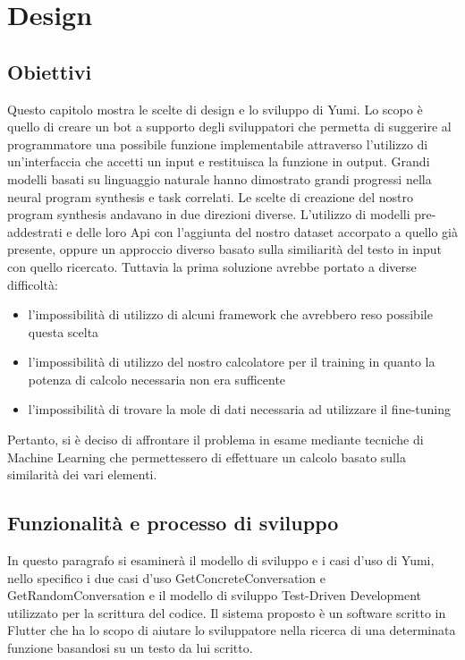 \chapter{Design} %
%
\begin{citazione}
\end{citazione}



\section{Obiettivi}
Questo capitolo mostra le scelte di design e lo sviluppo di Yumi. Lo scopo è quello di creare un bot a supporto degli sviluppatori che permetta di suggerire al programmatore una possibile funzione implementabile attraverso l'utilizzo di un'interfaccia che accetti un input e restituisca la funzione in output.
Grandi modelli basati su linguaggio naturale hanno dimostrato grandi progressi nella neural program synthesis e task correlati. Le scelte di creazione del nostro program synthesis andavano in due direzioni diverse. L'utilizzo di modelli pre-addestrati e delle loro Api con l'aggiunta del nostro dataset accorpato a quello già presente, oppure un approccio diverso basato sulla similiarità del testo in input con quello ricercato.
Tuttavia la prima soluzione avrebbe portato a diverse difficoltà:
\begin{itemize}
    \item l'impossibilità di utilizzo di alcuni framework che avrebbero reso possibile questa scelta
    \item l'impossibilità di utilizzo del nostro calcolatore per il training in quanto la potenza di calcolo necessaria non era sufficente
    \item l'impossibilità di trovare la mole di dati necessaria ad utilizzare il fine-tuning 
\end{itemize}
Pertanto, si è deciso di affrontare il problema in esame mediante tecniche di Machine Learning che permettessero di effettuare un calcolo basato sulla similarità dei vari elementi.
\section{Funzionalità e processo di sviluppo}
In questo paragrafo si esaminerà il modello di sviluppo e i casi d'uso di Yumi, nello specifico i due casi d'uso GetConcreteConversation e GetRandomConversation e il modello di sviluppo Test-Driven Development utilizzato per la scrittura del codice. Il sistema proposto è un software scritto in Flutter che ha lo scopo di aiutare lo sviluppatore nella ricerca di una determinata funzione basandosi su un testo da lui scritto.



